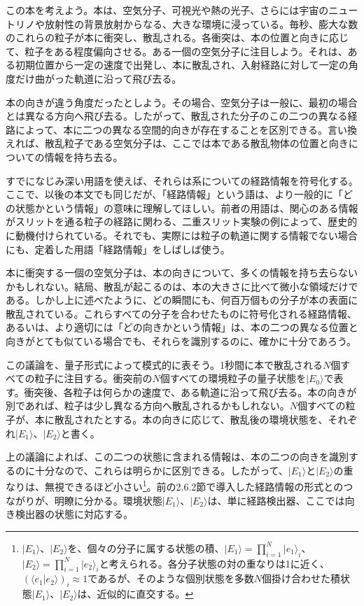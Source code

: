 

この本を考えよう。本は、空気分子、可視光や熱の光子、さらには宇宙のニュートリノや放射性の背景放射からなる、大きな環境に浸っている。毎秒、膨大な数のこれらの粒子が本に衝突し、散乱される。各衝突は、本の位置と向きに応じて、粒子をある程度偏向させる。ある一個の空気分子に注目しよう。それは、ある初期位置から一定の速度で出発し、本に散乱され、入射経路に対して一定の角度だけ曲がった軌道に沿って飛び去る。

本の向きが違う角度だったとしよう。その場合、空気分子は一般に、最初の場合とは異なる方向へ飛び去る。したがって、散乱された分子のこの二つの異なる経路によって、本に二つの異なる空間的向きが存在することを区別できる。言い換えれば、散乱粒子である空気分子は、ここでは本である散乱物体の位置と向きについての情報を持ち去る。

\hypertarget{srcpage:66}{}\label{srcpage:66}
すでになじみ深い用語を使えば、それらは系についての経路情報を符号化する。ここで、以後の本文でも同じだが、「経路情報」という語は、より一般的に「どの状態かという情報」の意味に理解してほしい。前者の用語は、関心のある情報がスリットを通る粒子の経路に関わる、二重スリット実験の例によって、歴史的に動機付けられている。それでも、実際には粒子の軌道に関する情報でない場合にも、定着した用語「経路情報」をしばしば使う。

本に衝突する一個の空気分子は、本の向きについて、多くの情報を持ち去らないかもしれない。結局、散乱が起こるのは、本の大きさに比べて微小な領域だけである。しかし上に述べたように、どの瞬間にも、何百万個もの分子が本の表面に散乱されている。これらすべての分子を合わせたものに符号化される経路情報、あるいは、より適切には「どの向きかという情報」は、本の二つの異なる位置と向きがとても似ている場合でも、それらを識別するのに、確かに十分であろう。

この議論を、量子形式によって模式的に表そう。1秒間に本で散乱される$N$個すべての粒子に注目する。衝突前の$N$個すべての環境粒子の量子状態を$\lvert E_0\rangle$で表す。衝突後、各粒子は何らかの速度で、ある軌道に沿って飛び去る。本の向きが別であれば、粒子は少し異なる方向へ散乱されるかもしれない。$N$個すべての粒子が、本に散乱されたとする。本の向きに応じて、散乱後の環境状態を、それぞれ$\lvert E_1\rangle$、$\lvert E_2\rangle$と書く。

上の議論によれば、この二つの状態に含まれる情報は、本の二つの向きを識別するのに十分なので、これらは明らかに区別できる。したがって、$\lvert E_1\rangle$と$\lvert E_2\rangle$の重なりは、無視できるほど小さい\footnote{$\lvert E_1\rangle$、$\lvert E_2\rangle$を、個々の分子に属する状態の積、$\lvert E_1\rangle=\prod_{i=1}^N\lvert e_1\rangle_i$、$\lvert E_2\rangle=\prod_{i=1}^N\lvert e_2\rangle_i$と考えられる。各分子状態の対の重なりは1に近く、$(\langle e_1\vert e_2\rangle)_i\approx1$であるが、そのような個別状態を多数$N$個掛け合わせた積状態$\lvert E_1\rangle$、$\lvert E_2\rangle$は、近似的に直交する。}。前の2.6.2節で導入した経路情報の形式とのつながりが、明瞭に分かる。環境状態$\lvert E_1\rangle$、$\lvert E_2\rangle$は、単に経路検出器、ここでは向き検出器の状態に対応する。

